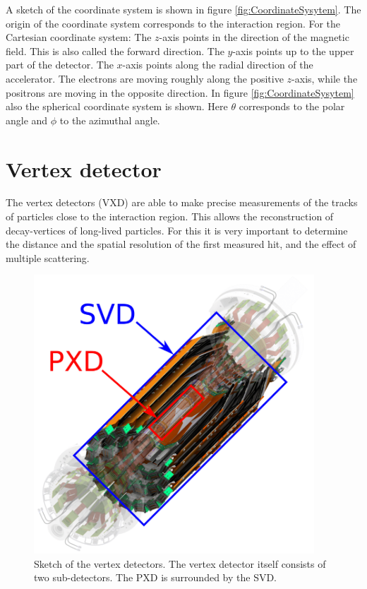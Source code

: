 \documentclass[a4paper,11pt,twosided,final,german,openbib,pdftex,listof=totoc,bibliography=totoc]{scrbook}
\begin{document}
A sketch of the coordinate system is shown in figure \ref{fig:CoordinateSysytem}. The origin of the coordinate system corresponds to the interaction region. For the Cartesian coordinate system: The $z$-axis points in the direction of the magnetic field. This is also called the forward direction. The $y$-axis points up to the upper part of the detector. The $x$-axis points along the radial direction of the accelerator. The electrons are moving roughly along the positive $z$-axis, while the positrons are moving in the opposite direction. In figure \ref{fig:CoordinateSysytem} also the spherical coordinate system is shown. Here $\theta$ corresponds to the polar angle and $\phi$ to the azimuthal angle.\cite{DevelopVertex}

\section{Vertex detector}
\label{sec:vertexDet}

The vertex detectors (VXD) are able to make precise measurements of the tracks of particles close to the interaction region. This allows the reconstruction of decay-vertices of long-lived particles. For this it is very important to determine the distance and the spatial resolution of the first measured hit, and the effect of multiple scattering.


\begin{figure}[h!]
	\begin{center}
		\includegraphics[width=10.5cm]{Bilder/PXD_SVD}
	\end{center}
\caption[Vertex Detector]{Sketch of the vertex detectors. The vertex detector itself consists of two sub-detectors. The PXD is surrounded by the SVD. \cite{OnlineDataReduction} }
\label{fig:VertexDet}
\end{figure}
\end{document}
